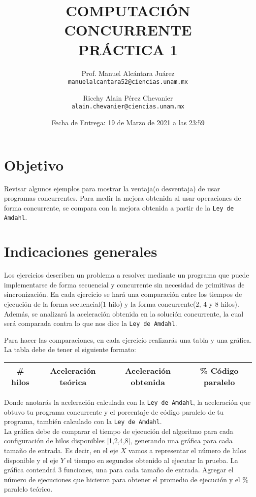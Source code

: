 \documentclass[a4paper,11pt]{article}
\title{COMPUTACIÓN CONCURRENTE \\ {\Large PRÁCTICA 1}}
\author{
	Prof. Manuel Alcántara Juárez \\
	\texttt{manuelalcantara52@ciencias.unam.mx}
	\and
	Ricchy Alain Pérez Chevanier \\
	\texttt{alain.chevanier@ciencias.unam.mx}
}
\date{Fecha de Entrega: 19 de Marzo de 2021 a las 23:59}
\begin{document}
	\maketitle

	\section{Objetivo}
	Revisar algunos ejemplos para mostrar la ventaja(o desventaja) de usar programas concurrentes. Para medir la mejora obtenida al usar operaciones de forma concurrente, se compara con la mejora obtenida a partir de la \verb|Ley de Amdahl|.

	\section{Indicaciones generales}
	Los ejercicios describen un problema a resolver mediante un programa que puede implementarse de forma secuencial y concurrente sin necesidad de primitivas de sincronización. En cada ejercicio se hará una comparación entre los tiempos de ejecución de la forma secuencial(1 hilo) y la forma concurrente(2, 4 y 8 hilos). Además, se analizará la aceleración obtenida en la solución concurrente, la cual será comparada contra lo que nos dice la \verb|Ley de Amdahl|.

	Para hacer las comparaciones, en cada ejercicio realizarás una tabla y una gráfica. \\

	La tabla debe de tener el siguiente formato:

	\begin{center}
		\begin{tabular}{|c|c|c|c|}
			\hline
			\# hilos & Aceleración teórica & Aceleración obtenida & \% Código paralelo \\
			\hline
		\end{tabular}
	\end{center}
	Donde anotarás la aceleración calculada con la \verb|Ley de Amdahl|, la aceleración que obtuvo tu programa concurrente y el porcentaje de código paralelo de tu programa, también calculado con la \verb|Ley de Amdahl|. \\

	La gráfica debe de comparar el tiempo de ejecución del algoritmo para cada configuración de hilos disponibles [1,2,4,8], generando una gráfica para cada tamaño de entrada. Es decir, en el eje $X$ vamos a representar el número de hilos disponible y el eje $Y$ el tiempo en segundos obtenido al ejecutar la prueba. La gráfica contendrá 3 funciones, una para cada tamaño de entrada. Agregar el número de ejecuciones que hicieron para obtener el promedio de ejecución y el \% paralelo teórico.
\end{document}
